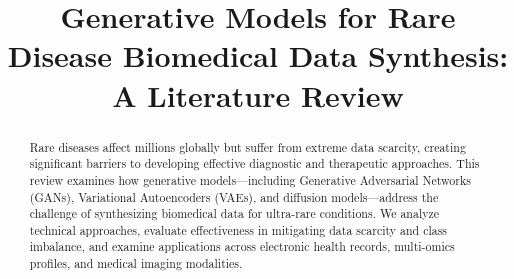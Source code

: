 \documentclass[conference]{IEEEtran}
\title{Generative Models for Rare Disease Biomedical Data Synthesis: A Literature Review}
\author{
}
\begin{document}
\maketitle

\begin{abstract}
Rare diseases affect millions globally but suffer from extreme data scarcity, creating significant barriers to developing effective diagnostic and therapeutic approaches. This review examines how generative models—including Generative Adversarial Networks (GANs), Variational Autoencoders (VAEs), and diffusion models—address the challenge of synthesizing biomedical data for ultra-rare conditions. We analyze technical approaches, evaluate effectiveness in mitigating data scarcity and class imbalance, and examine applications across electronic health records, multi-omics profiles, and medical imaging modalities.
\end{abstract}










\end{document}
